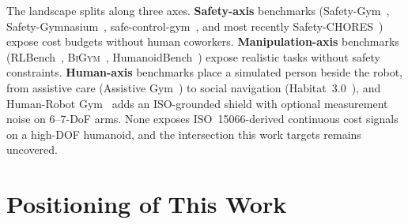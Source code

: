 \documentclass[11pt,a4paper]{report}
\newcommand{\iso}{ISO~15066}
\newcommand{\bigym}{\textsc{BiGym}}
\begin{document}
The landscape splits along three axes. \textbf{Safety-axis}
benchmarks (Safety-Gym~\cite{ray2019safetygym},
Safety-Gymnasium~\cite{ji2023safetygymnasium},
safe-control-gym~\cite{yuan2022safecontrolgym}, and most recently
Safety-CHORES~\cite{zhang2025safevla}) expose cost budgets without
human coworkers. \textbf{Manipulation-axis} benchmarks
(RLBench~\cite{james2020rlbench}, \bigym{}~\cite{chernyadev2024bigym},
HumanoidBench~\cite{sferrazza2024humanoidbench}) expose realistic
tasks without safety constraints. \textbf{Human-axis} benchmarks
place a simulated person beside the robot, from assistive care
(Assistive Gym~\cite{erickson2020assistivegym}) to social navigation
(Habitat~3.0~\cite{puig2024habitat3}), and Human-Robot
Gym~\cite{thumm2024humanrobotgym} adds an ISO-grounded shield with
optional measurement noise on 6--7-DoF arms. None exposes
\iso{}-derived continuous cost signals on a high-DOF humanoid, and
the intersection this work targets remains uncovered.

\section{Positioning of This Work}
\label{sec:bg:positioning}
\end{document}
